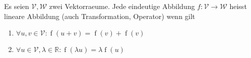 Es seien $\mathcal{V}, \mathcal{W}$ zwei Vektorraeume.  Jede eindeutige Abbildung $f : \mathcal{V} \to \mathcal{W}$ heisst lineare Abbildung (auch Transformation, Operator) wenn gilt
\begin{enumerate}
	\item $\forall u,v \in \mathcal{V} : \operatorname{f}(u + v) = \operatorname{f}(v) + \operatorname{f}(v)$ 
	\item $\forall u \in \mathcal{V}, \lambda \in \mathbb{R} : \operatorname{f}(\lambda u) = \lambda \operatorname{f}(u)$ 
\end{enumerate}

